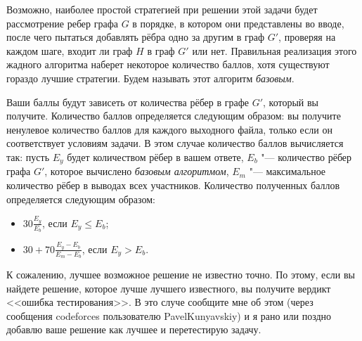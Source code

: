 Возможно, наиболее простой стратегией при решении этой задачи
будет рассмотрение ребер графа $G$ в порядке, в котором они представлены
во вводе, после чего пытаться добавлять рёбра одно за другим в граф $G'$,
проверяя на каждом шаге, входит ли граф $H$ в граф $G'$ или нет.
Правильная реализация этого жадного алгоритма наберет некоторое количество
баллов, хотя существуют гораздо лучшие стратегии.
Будем называть этот алгоритм \textit{базовым}.

Ваши баллы будут зависеть от количества рёбер в графе $G'$,
который вы получите.
Количество баллов определяется следующим образом: вы получите ненулевое
количество баллов для каждого выходного файла, только если он соответствует
условиям задачи.
В этом случае количество баллов вычисляется так: 
пусть $E_y$ будет количеством рёбер в вашем ответе, $E_b$ "--- количество
рёбер графа $G'$, которое вычислено \textit{базовым алгоритмом},
$E_m$ "--- максимальное количество рёбер в выводах всех участников.
Количество полученных баллов определяется следующим образом:

\begin{itemize}
\item $30 \frac{E_y}{E_b}$, если $E_y \le E_b$;
\item $30 + 70 \frac{E_y - E_b}{E_m - E_b}$, если $E_y > E_b$.
\end{itemize}

К сожалению, лучшее возможное решение не известно точно. По этому, если вы найдете решение, которое лучше лучшего известного, вы получите вердикт <<ошибка тестирования>>. В это случе сообщите мне об этом (через сообщения codeforces пользователю PavelKunyavskiy) и я рано или поздно добавлю ваше решение как лучшее и перетестирую задачу.
